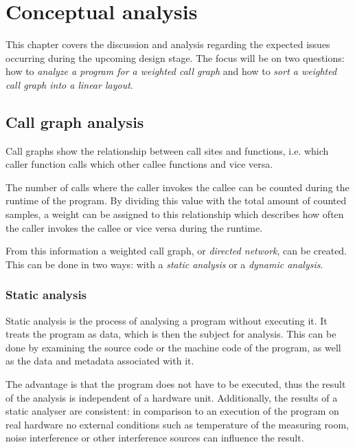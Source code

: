 \chapter{Conceptual analysis}\label{chapt:consider}

This chapter covers the discussion and analysis regarding the expected issues occurring during the upcoming design stage. The focus will be on two questions: how to \textit{analyze a program for a weighted call graph} and how to \textit{sort a weighted call graph into a linear layout}.

\section{Call graph analysis}\label{chapt:callgraph}

Call graphs show the relationship between call sites and functions, i.e. which caller function calls which other callee functions and vice versa. \cite[p. 133]{binanal} 

The number of calls where the caller invokes the callee can be counted during the runtime of the program. By dividing this value with the total amount of counted samples, a weight can be assigned to this relationship which describes how often the caller invokes the callee or vice versa during the runtime.

From this information a weighted call graph, or \textit{directed network}, can be created. \cite{graphintro} This can be done in two ways: with a \textit{static analysis} or a \textit{dynamic analysis}.

\subsection{Static analysis}

Static analysis is the process of analysing a program without executing it. It treats the program as data, which is then the subject for analysis. This can be done by examining the source code or the machine code of the program, as well as the data and metadata associated with it. \cite{binanal} \cite{lca-gcc-plugin} \cite{staticanalyze}

The advantage is that the program does not have to be executed, thus the result of the analysis is independent of a hardware unit. Additionally, the results of a static analyser are consistent: in comparison to an execution of the program on real hardware no external conditions such as temperature of the measuring room, noise interference or other interference sources can influence the result. \cite[p. 68]{patmc} \cite{staticanalyze}

